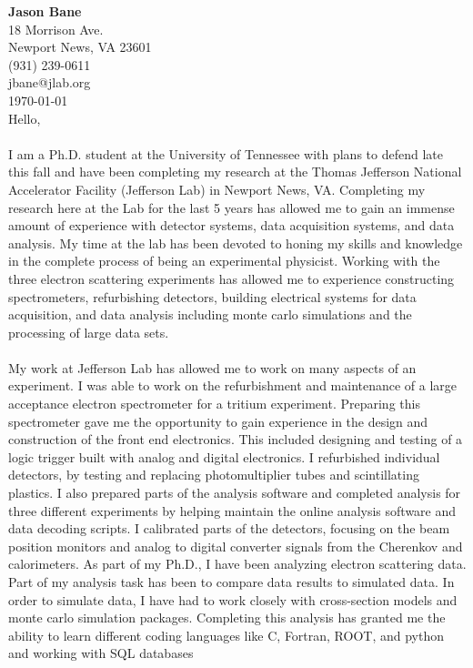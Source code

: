 \documentclass[12pt,letterpaper]{article}
\newcommand{\CPP}
{C\nolinebreak[4]\hspace{-.05em}\raisebox{.22ex}{\footnotesize\bf ++}}
\begin{document}
	
	\vspace*{-1.2cm}
	{\textbf{Jason Bane}}\\
	18 Morrison Ave. \\
	Newport News, VA 23601 \\
	(931) 239-0611 \\
	jbane@jlab.org \\
	\today\\
	
	Hello, 
	
	\paragraph{}I am a Ph.D. student at the University of Tennessee with plans to defend late this fall and have been completing my research at the Thomas Jefferson National Accelerator Facility (Jefferson Lab) in Newport News, VA. Completing my research here at the Lab for the last 5 years has allowed me to gain an immense amount of experience with detector systems, data acquisition systems, and data analysis. My time at the lab has been devoted to honing my skills and knowledge in the complete process of being an experimental physicist. Working with the three electron scattering experiments has allowed me to experience constructing spectrometers, refurbishing detectors, building electrical systems for data acquisition, and data analysis including monte carlo simulations and the processing of large data sets.  
	\paragraph{}My work at Jefferson Lab has allowed me to work on many aspects of an experiment. I was able to work on the refurbishment and maintenance of a large acceptance electron spectrometer for a tritium experiment. Preparing this spectrometer gave me the opportunity to gain experience in the design and construction of the front end electronics. This included designing and testing of a logic trigger built with analog and digital electronics. I refurbished individual detectors, by testing and replacing photomultiplier tubes and scintillating plastics.  
	I also prepared parts of the analysis software and completed analysis for three different experiments by helping maintain the online analysis software and data decoding scripts. I calibrated parts of the detectors, focusing on the beam position monitors and analog to digital converter signals from the Cherenkov and calorimeters. As part of my Ph.D., I have been analyzing electron scattering data. Part of my analysis task has been to compare data results to simulated data. In order to simulate data, I have had to work closely with cross-section models and monte carlo simulation packages. Completing this analysis has granted me the ability to learn different coding languages like \CPP, Fortran, ROOT, and python and working with SQL databases   
	
\end{document}
